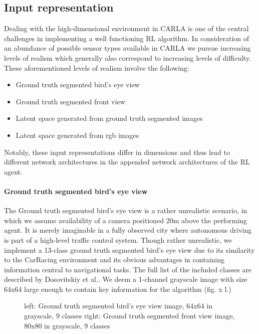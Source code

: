 \documentclass[letterpaper, 10 pt, conference]{ieeeconf}  %
\begin{document}
\subsection{Input representation}
Dealing with the high-dimensional environment in CARLA is one of the central challenges in implementing a well functioning 
RL algorithm. In consideration of an abundance of possible sensor types available in CARLA we pursue increasing
levels of realism which generally also correspond to increasing levels of difficulty. These aforementioned levels of realism involve the following:
\begin{itemize}
    \item Ground truth segmented bird's eye view
    \item Ground truth segmented front view
    \item Latent space generated from ground truth segmented images
    \item Latent space generated from rgb images
\end{itemize}
Notably, these input representations differ in dimensions and thus lead to different network architectures in the appended network architectures 
of the RL agent. 
\paragraph{Ground truth segmented bird's eye view}
The Ground truth segmented bird's eye view is a rather unrealistic scenario, in which we assume availability of a camera positioned 
20m above the performing agent. It is merely imaginable in a fully observed city where autonomous driving is part of a high-level traffic 
control system. Though rather unrealistic, we implement a 13-class ground truth segmented bird's eye view due to its similarity to 
the CarRacing 
environment and its obvious advantages in containing information central to navigational tasks. The full list of the 
included classes are described by Dosovitskiy et al.\cite{dosovitskiy2017carla}. We deem a 1-channel 
grayscale image with size 64x64 
large enough to contain key information for the algorithm (fig. x l.)

\begin{figure}[thpb]
    \centering
    \caption{left: Ground truth segmented bird's eye view image, 64x64 in grayscale, 9 classes
    right: Ground truth segmented front view image, 80x80 in grayscale, 9 classes}
        \label{figurelabel}
        \end{figure}
\end{document}
